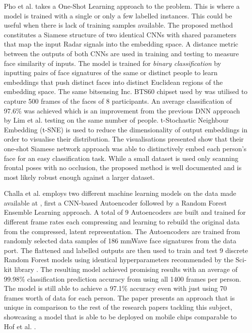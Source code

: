 \documentclass{interim}
\begin{document}
Pho et al. \cite{pho2021radar} takes a One-Shot Learning approach to the problem. This is where a model is trained with a single or only a few labelled instances. This could be useful when there is lack of training samples available. The proposed method constitutes a Siamese structure of two identical CNNs with shared parameters that map the input Radar signals into the embedding space. A distance metric between the outputs of both CNNs are used in training and testing to measure face similarity of inputs. The model is trained for \textit{binary classification} by inputting pairs of face signatures of the same or distinct people to learn embeddings that push distinct faces into distinct Euclidean regions of the embedding space. The same bitsensing Inc. BTS60 chipset used by \cite{lim2020dnn, kim2020face} was utilised to capture 500 frames of the faces of 8 participants. An average classification of 97.6\% was achieved which is an improvement from the previous DNN approach by Lim et al. \cite{lim2020dnn} testing on the same number of people. t-Stochastic Neighbour Embedding (t-SNE) \cite{van2008visualizing} is used to reduce the dimensionality of output embeddings in order to visualise their distribution. The visualisations presented show that their one-shot Siamese network approach was able to distinctively embed each person's face for an easy classification task. While a small dataset is used only scanning frontal poses with no occlusion, the proposed method is well documented and is most likely robust enough against a larger dataset.

Challa et al. \cite{challa2021face} employs two different machine learning models on the data made available at \cite{mmwavefacedata}, first a CNN-based Autoencoder followed by a Random Forest Ensemble Learning approach. A total of 9 Autoencoders are built and trained for different frame rates each compressing and learning to rebuild the original data from the compressed, latent representation. The Autoencoders are trained from randomly selected data samples of 186 mmWave face signatures from the data port. The flattened and labelled outputs are then used to train and test 9 discrete Random Forest models using identical hyperparameters recommended by the Sci-kit library \cite{}. The resulting model achieved promising results with an average of 99.98\% classification prediction accuracy from using all 1400 frames per person. The model is still able to achieve a 97.1\% accuracy even with just using 70 frames worth of data for each person. The paper presents an approach that is unique in comparison to the rest of the research papers tackling this subject, showcasing a model that is able to be deployed on mobile chips comparable to Hof et al. \cite{hof2020face}.
\end{document}
